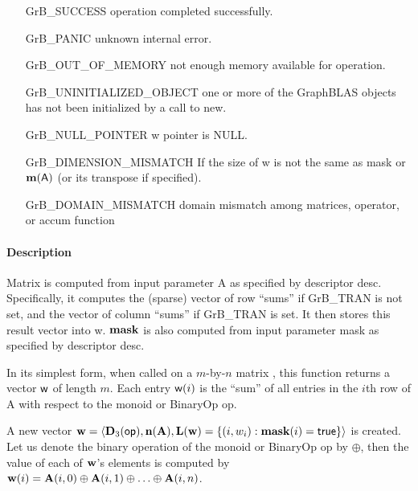 \begin{itemize}[leftmargin=2.1in]
\item[{\sf GrB\_SUCCESS}]    operation completed successfully.
\item[{\sf GrB\_PANIC}]      unknown internal error.

\item[{\sf GrB\_OUT\_OF\_MEMORY}]          not enough memory available for operation.
\item[{\sf GrB\_UNINITIALIZED\_OBJECT}]          one or more of the GraphBLAS objects has
                                    not been initialized by a call to {\sf new}.
\item[{\sf GrB\_NULL\_POINTER}]    {\sf w} pointer is {\sf NULL}.

\item[{\sf GrB\_DIMENSION\_MISMATCH}]            
        If the size of {\sf w} is not the same as {\sf mask} or $\bold{m}({\sf A})$ (or its transpose if specified).
\item[{\sf GrB\_DOMAIN\_MISMATCH}]  
        domain mismatch among matrices, operator, or
        accum function 
\end{itemize}


\paragraph{Description}

Matrix  is computed from input parameter {\sf A} as specified
by descriptor {\sf desc}. Specifically, it computes the (sparse) vector of row ``sums'' if 
GrB\_TRAN  is not set, and the vector of column ``sums'' if GrB\_TRAN  is set. It then
stores this result vector into {\sf w}. ${\bf mask}$ is also computed from input parameter {\sf mask}
as specified by descriptor {\sf desc}.

In its simplest form, when called on a $m$-by-$n$ matrix , this function returns a vector ${\sf w}$ 
of length $m$. Each entry ${\sf w}(i)$ is the ``sum'' of all entries in the $i$th row of 
{\sf A} with respect to the monoid or BinaryOp {\sf op}. 


A new vector ${\bf w} = \langle \bold{D}_3({\sf op}),
\bold{n}({\bf A}), \bold{L}({\bf w}) = \{(i,w_i) : {\bf mask}(i)
= {\sf true} \} \rangle$ is created.  Let us denote the binary operation of the monoid or BinaryOp {\sf op} by $\oplus$,
then the value of each of ${\bf w}$'s elements
is computed by $ {\bf w}(i) = {\bf A}(i,0) \oplus {\bf A}(i,1) \oplus  \ldots \oplus  {\bf A}(i,n)$.  
 

